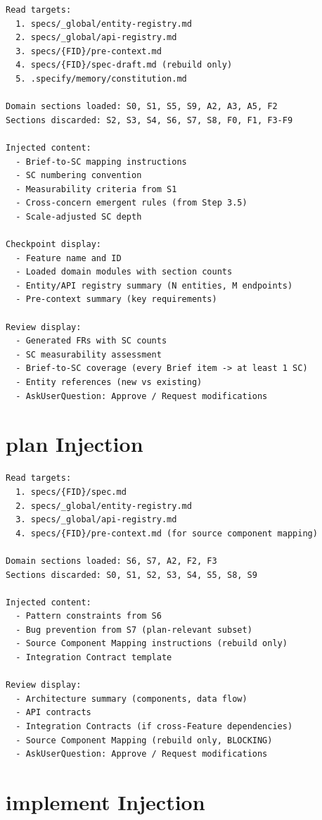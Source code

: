 \documentclass[11pt,a4paper,openright,twoside]{report}
\begin{document}
\begin{lstlisting}[title={specify Context Assembly}]
Read targets:
  1. specs/_global/entity-registry.md
  2. specs/_global/api-registry.md
  3. specs/{FID}/pre-context.md
  4. specs/{FID}/spec-draft.md (rebuild only)
  5. .specify/memory/constitution.md

Domain sections loaded: S0, S1, S5, S9, A2, A3, A5, F2
Sections discarded: S2, S3, S4, S6, S7, S8, F0, F1, F3-F9

Injected content:
  - Brief-to-SC mapping instructions
  - SC numbering convention
  - Measurability criteria from S1
  - Cross-concern emergent rules (from Step 3.5)
  - Scale-adjusted SC depth

Checkpoint display:
  - Feature name and ID
  - Loaded domain modules with section counts
  - Entity/API registry summary (N entities, M endpoints)
  - Pre-context summary (key requirements)

Review display:
  - Generated FRs with SC counts
  - SC measurability assessment
  - Brief-to-SC coverage (every Brief item -> at least 1 SC)
  - Entity references (new vs existing)
  - AskUserQuestion: Approve / Request modifications
\end{lstlisting}

\section{plan Injection}

\begin{lstlisting}[title={plan Context Assembly}]
Read targets:
  1. specs/{FID}/spec.md
  2. specs/_global/entity-registry.md
  3. specs/_global/api-registry.md
  4. specs/{FID}/pre-context.md (for source component mapping)

Domain sections loaded: S6, S7, A2, F2, F3
Sections discarded: S0, S1, S2, S3, S4, S5, S8, S9

Injected content:
  - Pattern constraints from S6
  - Bug prevention from S7 (plan-relevant subset)
  - Source Component Mapping instructions (rebuild only)
  - Integration Contract template

Review display:
  - Architecture summary (components, data flow)
  - API contracts
  - Integration Contracts (if cross-Feature dependencies)
  - Source Component Mapping (rebuild only, BLOCKING)
  - AskUserQuestion: Approve / Request modifications
\end{lstlisting}

\section{implement Injection}
\end{document}
